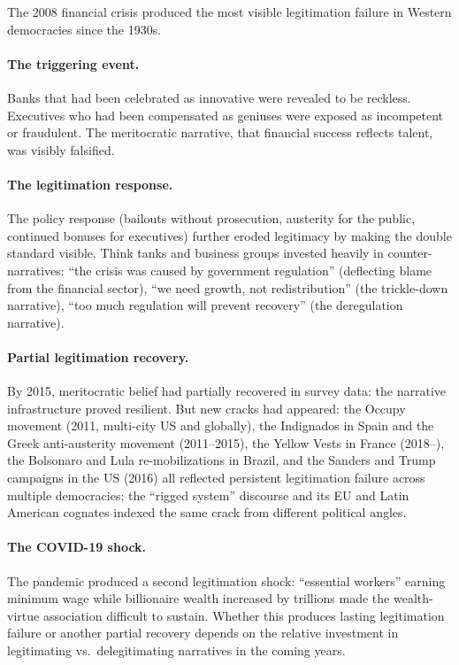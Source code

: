 \begin{example}
\label{ex:legitimation-crisis}
The 2008 financial crisis produced the most visible legitimation failure in Western democracies since the 1930s.

\paragraph{The triggering event.}
Banks that had been celebrated as innovative were revealed to be reckless.
Executives who had been compensated as geniuses were exposed as incompetent or fraudulent.
The meritocratic narrative, that financial success reflects talent, was visibly falsified.

\paragraph{The legitimation response.}
The policy response (bailouts without prosecution, austerity for the public, continued bonuses for executives) further eroded legitimacy by making the double standard visible.
Think tanks and business groups invested heavily in counter-narratives: ``the crisis was caused by government regulation'' (deflecting blame from the financial sector), ``we need growth, not redistribution'' (the trickle-down narrative), ``too much regulation will prevent recovery'' (the deregulation narrative).

\paragraph{Partial legitimation recovery.}
By 2015, meritocratic belief had partially recovered in survey data: the narrative infrastructure proved resilient.
But new cracks had appeared: the Occupy movement (2011, multi-city US and globally), the Indignados in Spain and the Greek anti-austerity movement (2011--2015), the Yellow Vests in France (2018--), the Bolsonaro and Lula re-mobilizations in Brazil, and the Sanders and Trump campaigns in the US (2016) all reflected persistent legitimation failure across multiple democracies; the ``rigged system'' discourse and its EU and Latin American cognates indexed the same crack from different political angles.

\paragraph{The COVID-19 shock.}
The pandemic produced a second legitimation shock: ``essential workers'' earning minimum wage while billionaire wealth increased by trillions made the wealth-virtue association difficult to sustain.
Whether this produces lasting legitimation failure or another partial recovery depends on the relative investment in legitimating vs.\ delegitimating narratives in the coming years.
\end{example}

